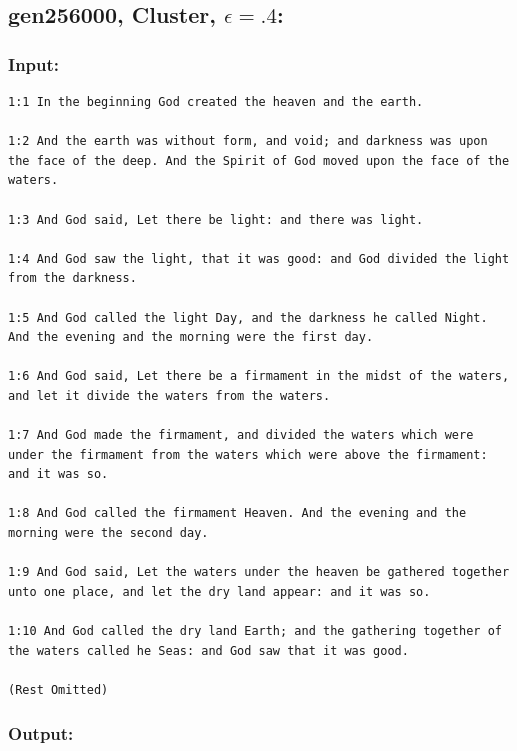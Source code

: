 \documentclass[11pt]{article}
\begin{document}
\vspace{0.2in}
\subsection*{gen256000, Cluster, $\epsilon=.4$:}

\subsubsection*{Input:}

\begin{lstlisting}
1:1 In the beginning God created the heaven and the earth.

1:2 And the earth was without form, and void; and darkness was upon
the face of the deep. And the Spirit of God moved upon the face of the
waters.

1:3 And God said, Let there be light: and there was light.

1:4 And God saw the light, that it was good: and God divided the light
from the darkness.

1:5 And God called the light Day, and the darkness he called Night.
And the evening and the morning were the first day.

1:6 And God said, Let there be a firmament in the midst of the waters,
and let it divide the waters from the waters.

1:7 And God made the firmament, and divided the waters which were
under the firmament from the waters which were above the firmament:
and it was so.

1:8 And God called the firmament Heaven. And the evening and the
morning were the second day.

1:9 And God said, Let the waters under the heaven be gathered together
unto one place, and let the dry land appear: and it was so.

1:10 And God called the dry land Earth; and the gathering together of
the waters called he Seas: and God saw that it was good.

(Rest Omitted)

\end{lstlisting}

\subsubsection*{Output:}
\end{document}
